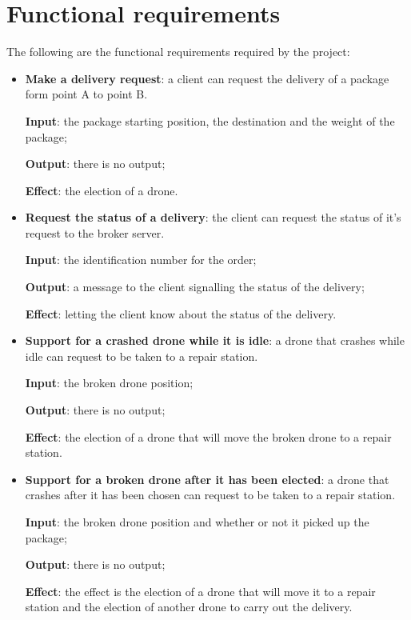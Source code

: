 \documentclass[a4paper, oneside]{memoir}
\begin{document}
\section{Functional requirements}
\label{func-req}

The following are the functional requirements required by the project:
\begin{itemize}
\item \textbf{Make a delivery request}: a client can request the delivery of a package form point A to point B.

	\textbf{Input}: the package starting position, the destination and the weight of the package;

	\textbf{Output}: there is no output;

	\textbf{Effect}: the election of a drone.

\item \textbf{Request the status of a delivery}: the client can request the status of it's request to the broker server.

 	\textbf{Input}: the identification number for the order;

	\textbf{Output}: a message to the client signalling the status of the delivery;

	\textbf{Effect}: letting the client know about the status of the delivery.

\item \textbf{Support for a crashed drone while it is idle}: a drone that crashes while idle can request to be taken to a repair station.

	\textbf{Input}: the broken drone position;

	\textbf{Output}: there is no output;

	\textbf{Effect}: the election of a drone that will move the broken drone to a repair station.

\item \textbf{Support for a broken drone after it has been elected}: a drone that crashes after it has been chosen can request to be taken to a repair station.

	\textbf{Input}: the broken drone position and whether or not it picked up the package;

	\textbf{Output}: there is no output;

	\textbf{Effect}: the effect is the election of a drone that will move it to a repair station and the election of another drone to carry out the delivery.


\end{itemize}
\end{document}
